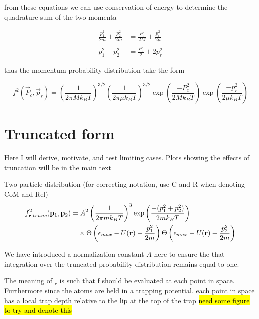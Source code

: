 from these equations we can use conservation of energy to determine the quadrature sum of the two momenta

\begin{align*}
	\frac{p_1^2}{2m} + \frac{p_2^2}{2m} &= \frac{P_c^2}{2M} + \frac{p_r^2}{2\mu} \\
	p_1^2 + p_2^2 &= \frac{P_c^2}{2} + 2 p_r^2
\end{align*}

thus the momentum probability distribution take the form

\begin{equation}
\label{eq:two_particle_prob_inf_atomFrame}
		 f^2( \vec{P}_c, \vec{p}_r ) = \left(\frac{1}{2 \pi M k_B T}\right)^{3/2} \left(\frac{1}{2 \pi \mu k_B T}\right)^{3/2} 
		 \exp\left(\frac{-P_c^2}{2 M k_B T}\right) \exp\left(\frac{-p_r^2}{2 \mu k_B T}\right)
\end{equation}

\section{Truncated form}
\label{sec:truncDist}

Here I will derive, motivate, and test limiting cases. Plots showing the effects of truncation will be in the main text

Two particle distribution (for correcting notation, use C and R when denoting CoM and Rel)
\begin{equation}
\begin{split}
	f^2_{\mathbf{r},trunc} (\mathbf{p}_1, \mathbf{p}_2) &= A^2 \left(\frac{1}{2 \pi m k_B T}\right)^3 \exp \left( \frac{-(p_1^2 + p_2^2)}{2 m k_B T} \right) \\ &\quad \times \Theta \left( {\epsilon_{max} - U(\mathbf{r}) - \frac{p_1^2}{2m}} \right) \Theta \left( {\epsilon_{max} - U(\mathbf{r}) - \frac{p_2^2}{2m}} \right)
\end{split}
\end{equation}

We have introduced a normalization constant $A$ here to ensure the that integration over the truncated probability distribution remains equal to one.

The meaning of $_r$ is such that f should be evaluated at each point in space. Furthermore since the atoms are held in a trapping potential. each point in space has a local trap depth relative to the lip at the top of the trap \hl{need some figure to try and denote this}

